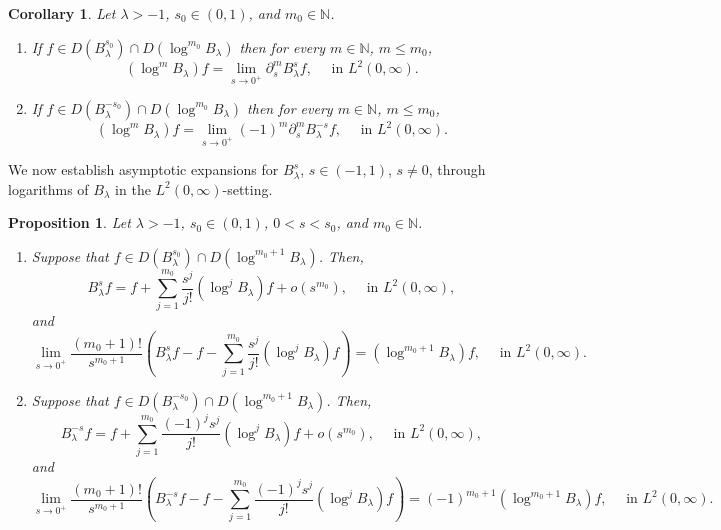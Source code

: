 \documentclass[10pt,a4paper]{amsart}
\newtheorem{cor}[thm]{Corollary}
\newtheorem{prop}[thm]{Proposition}
\numberwithin{equation}{section}
\begin{document}
\begin{cor}\label{cor: Cor2.5}
    Let $\lambda >-1$, $s_0\in (0,1)$, and $m_0\in \mathbb N$.
\begin{enumerate} 
    \item If $f\in D(B_\lambda^{s_0})\cap D(\log^{m_0}B_\lambda)$ then for every $m\in \mathbb N$, $m\leq m_0$,
\[
(\log^m B_\lambda)f=\lim_{s\rightarrow 0^+}\partial_s^m B_\lambda^sf,\quad \mbox{ in }L^2(0,\infty).
\]
\item If $f\in D(B_\lambda^{-s_0})\cap D(\log^{m_0}B_\lambda)$ then for every $m\in \mathbb N$, $m\leq m_0$,
\[
(\log^m B_\lambda)f=\lim_{s\rightarrow 0^+}(-1)^m\partial_s^m B_\lambda^{-s}f,\quad \mbox{ in }L^2(0,\infty).
\]
\end{enumerate}
\end{cor}
We now establish asymptotic expansions for $B_\lambda^s$, $s\in (-1,1)$, $s\neq 0$, through logarithms of $B_\lambda$ in the $L^2(0,\infty)$-setting.


\begin{prop}\label{prop: Prop2.5}
  Let $\lambda >-1$, $s_0\in (0,1)$, $0<s<s_0$, and $m_0\in \mathbb N$.
  \begin{enumerate}
      \item \label{itm: Prop2.5 a} Suppose that $f\in D(B_\lambda^{s_0})\cap D(\log^{m_0+1}B_\lambda)$. Then,
      \[
      B_\lambda^s f=f+\sum_{j=1}^{m_0}\frac{s^j}{j!}(\log^jB_\lambda)f+o(s^{m_0}),\quad \mbox{ in }L^2(0,\infty),
      \]
      and
      \[
      \lim_{s\rightarrow 0^+}\frac{(m_0+1)!}{s^{m_0+1}}\left(B_\lambda^sf-f-\sum_{j=1}^{m_0}\frac{s^j}{j!}(\log^jB_\lambda)f\right)=(\log^{m_0+1}B_\lambda)f,\quad \mbox{ in }L^2(0,\infty).
      \]
      \item \label{itm: Prop2.5 b} Suppose that $f\in D(B_\lambda^{-s_0})\cap D(\log^{m_0+1}B_\lambda)$. Then,
      \[
      B_\lambda^{-s}f=f+\sum_{j=1}^{m_0}\frac{(-1)^js^j}{j!}(\log^jB_\lambda)f+o(s^{m_0}),\quad \mbox{ in }L^2(0,\infty),
      \]
      and
      \[
      \lim_{s\rightarrow 0^+}\frac{(m_0+1)!}{s^{m_0+1}}\left(B_\lambda^{-s}f-f-\sum_{j=1}^{m_0}\frac{(-1)^js^j}{j!}(\log^jB_\lambda)f\right)=(-1)^{m_0+1}(\log^{m_0+1}B_\lambda)f,\quad \mbox{ in }L^2(0,\infty).
      \]
  \end{enumerate}
\end{prop}
\end{document}
